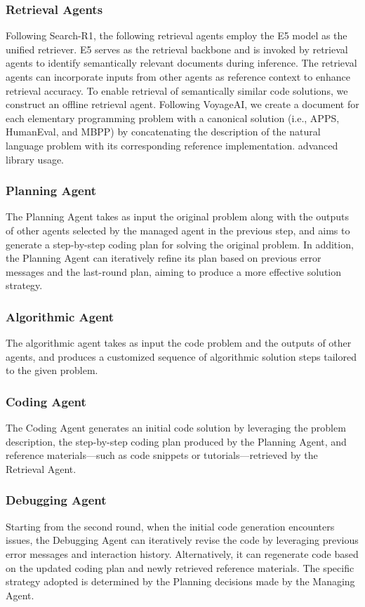 \documentclass{article}
\theoremstyle{definition}
\begin{document}
\subsubsection{Retrieval Agents}
Following Search-R1\citep{jin2025search}, the following retrieval agents employ the E5 model as the unified retriever. E5 serves as the retrieval backbone and is invoked by retrieval agents to identify semantically relevant documents during inference. The retrieval agents can incorporate inputs from other agents as reference context to enhance retrieval accuracy.
To enable retrieval of semantically similar code solutions, we construct an offline retrieval agent. Following VoyageAI, we create a document for each elementary programming problem with a canonical solution (i.e., APPS, HumanEval, and MBPP) by concatenating the description of the natural language problem with its corresponding reference implementation.
advanced library usage.
\subsubsection{Planning Agent}
The Planning Agent takes as input the original problem along with the outputs of other agents selected by the managed agent in the previous step, and aims to generate a step-by-step coding plan for solving the original problem. In addition, the Planning Agent can iteratively refine its plan based on previous error messages and the last-round plan, aiming to produce a more effective solution strategy.
\subsubsection{Algorithmic Agent}
The algorithmic agent takes as input the code problem and the outputs of other agents, and produces a customized sequence of algorithmic solution steps tailored to the given problem.
\subsubsection{Coding Agent}
The Coding Agent generates an initial code solution by leveraging the problem description, the step-by-step coding plan produced by the Planning Agent, and reference materials—such as code snippets or tutorials—retrieved by the Retrieval Agent.
\subsubsection{Debugging Agent}
Starting from the second round, when the initial code generation encounters issues, the Debugging Agent can iteratively revise the code by leveraging previous error messages and interaction history. Alternatively, it can regenerate code based on the updated coding plan and newly retrieved reference materials. The specific strategy adopted is determined by the Planning decisions made by the Managing Agent.
\end{document}
